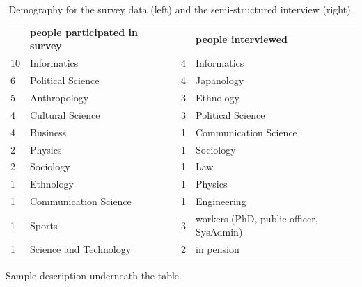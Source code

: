 		\begin{table}[h]
		\begin{tabular}{lllll}
		   & \textbf{people participated in survey} &  &   & \textbf{people interviewed}             \\
		10 & Informatics                            &  & 4 & Informatics                             \\
		6  & Political Science                      &  & 4 & Japanology                              \\
		5  & Anthropology                           &  & 3 & Ethnology                               \\
		4  & Cultural Science                       &  & 3 & Political Science                       \\
		4  & Business                               &  & 1 & Communication Science                   \\
		2  & Physics                                &  & 1 & Sociology                               \\
		2  & Sociology                              &  & 1 & Law                                     \\
		1  & Ethnology                              &  & 1 & Physics                                 \\
		1  & Communication Science                  &  & 1 & Engineering                             \\
		1  & Sports                                 &  & 3 & workers (PhD, public officer, SysAdmin) \\
		1  & Science and Technology                 &  & 2 & in pension          
		\end{tabular}

		\begin{tablenotes}
      		\small
      		 \item Sample description underneath the table. 
		\end{tablenotes}
		\caption[Demographics of Field Study]{Demography for the survey data (left) and the semi-structured interview (right).}
		\label{table:demographics}
		\end{table}


